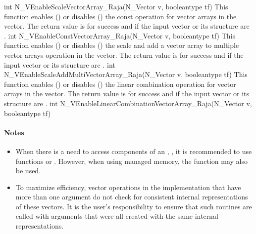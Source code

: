 {
  int N\_VEnableScaleVectorArray\_Raja(N\_Vector v, booleantype tf)
}
{
  This function enables () or disables () the const
  operation for vector arrays in the {\raja} vector. The return value is  for
  success and  if the input vector or its  structure are .
}
{
  int N\_VEnableConstVectorArray\_Raja(N\_Vector v, booleantype tf)
}
{
  This function enables () or disables () the scale and
  add a vector array to multiple vector arrays operation in the {\raja} vector. The
  return value is  for success and  if the input vector or its
   structure are .
}
{
  int N\_VEnableScaleAddMultiVectorArray\_Raja(N\_Vector v, booleantype tf)
}
{
  This function enables () or disables () the linear
  combination operation for vector arrays in the {\raja} vector. The return value
  is  for success and  if the input vector or its  structure
  are .
}
{
  int N\_VEnableLinearCombinationVectorArray\_Raja(N\_Vector v,
  booleantype tf)
}
\paragraph{\bf Notes}

\begin{itemize}

\item
  When there is a need to access components of an , ,
  it is recommended to use functions  or
  . However, when using managed memory, the
  function  may also be used.


\item
  {\warn}To maximize efficiency, vector operations in the {\nvecraja} implementation
  that have more than one  argument do not check for
  consistent internal representations of these vectors. It is the user's
  responsibility to ensure that such routines are called with 
  arguments that were all created with the same internal representations.

\end{itemize}
